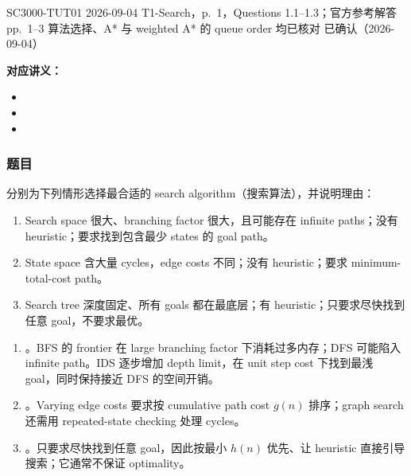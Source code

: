 
\label{tutorial:SC3000-TUT01}

\tutorialmeta
  {SC3000-TUT01}
  {2026-09-04}
  {T1-Search，p.~1，Questions 1.1--1.3；官方参考解答 pp.~1--3}
  {算法选择、A* 与 weighted A* 的 queue order 均已核对}
  {已确认（2026-09-04）}


\textbf{对应讲义：}
\begin{itemize}
  \item {}
  \item {}
  \item {}
\end{itemize}

\subsubsection*{题目}

分别为下列情形选择最合适的 search algorithm（搜索算法），并说明理由：
\begin{enumerate}[label=(\alph*)]
  \item Search space 很大、branching factor 很大，且可能存在 infinite paths；没有 heuristic；要求找到包含最少 states 的 goal path。
  \item State space 含大量 cycles，edge costs 不同；没有 heuristic；要求 minimum-total-cost path。
  \item Search tree 深度固定、所有 goals 都在最底层；有 heuristic；只要求尽快找到任意 goal，不要求最优。
\end{enumerate}

\begin{checkedsolution}
\begin{enumerate}[label=(\alph*)]
  \item {}。BFS 的 frontier 在 large branching factor 下消耗过多内存；DFS 可能陷入 infinite path。IDS 逐步增加 depth limit，在 unit step cost 下找到最浅 goal，同时保持接近 DFS 的空间开销。
  \item {}。Varying edge costs 要求按 cumulative path cost $g(n)$ 排序；graph search 还需用 repeated-state checking 处理 cycles。
  \item {}。只要求尽快找到任意 goal，因此按最小 $h(n)$ 优先、让 heuristic 直接引导搜索；它通常不保证 optimality。
\end{enumerate}
\end{checkedsolution}

